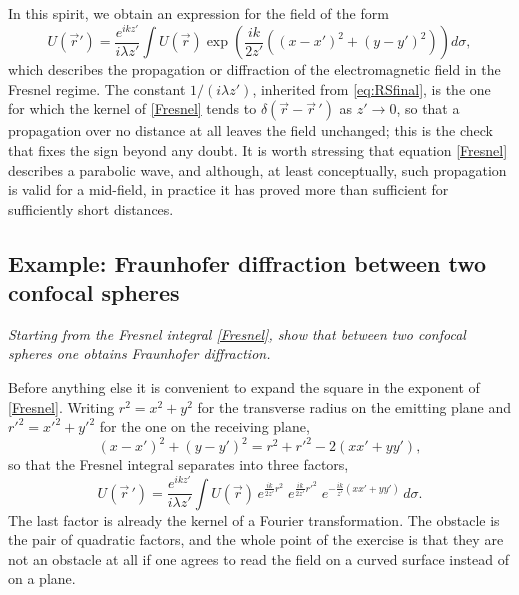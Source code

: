 In this spirit, we obtain an expression for the field of the form
\begin{equation}
	\label{Fresnel}
	U(\vec{r}') = \dfrac{e^{ikz'}}{i\lambda z'} \int U(\vec{r}) \exp \left(\dfrac{ik}{2z'} ((x-x')^2 + (y-y')^2) \right) d\sigma,
\end{equation}
which describes the propagation or diffraction of the electromagnetic field in the Fresnel regime. The constant $1/(i\lambda z')$, inherited from \eqref{eq:RSfinal}, is the one for which the kernel of \eqref{Fresnel} tends to $\delta(\vec{r}-\vec{r}\,')$ as $z'\to 0$, so that a propagation over no distance at all leaves the field unchanged; this is the check that fixes the sign beyond any doubt. It is worth stressing that equation \eqref{Fresnel} describes a parabolic wave, and although, at least conceptually, such propagation is valid for a mid-field, in practice it has proved more than sufficient for sufficiently short distances.

	\subsection{Example: Fraunhofer diffraction between two confocal spheres}

		\textit{Starting from the Fresnel integral \eqref{Fresnel}, show that between two confocal spheres one obtains Fraunhofer diffraction.}

		Before anything else it is convenient to expand the square in the exponent of \eqref{Fresnel}. Writing $r^{2} = x^{2}+y^{2}$ for the transverse radius on the emitting plane and $r'^{2} = x'^{2}+y'^{2}$ for the one on the receiving plane,
		\begin{equation}\label{eq:ExpandFresnelSquare}
			(x-x')^{2} + (y-y')^{2} = r^{2} + r'^{2} - 2\left(xx'+yy'\right),
		\end{equation}
		so that the Fresnel integral separates into three factors,
		\begin{equation}\label{eq:FresnelThreeFactors}
			U(\vec{r}\,') = \dfrac{e^{ikz'}}{i\lambda z'}\int U(\vec{r})\,
			e^{\frac{ik}{2z'}r^{2}}\;
			e^{\frac{ik}{2z'}r'^{2}}\;
			e^{-\frac{ik}{z'}\left(xx'+yy'\right)}\,d\sigma .
		\end{equation}
		The last factor is already the kernel of a Fourier transformation. The obstacle is the pair of quadratic factors, and the whole point of the exercise is that they are not an obstacle at all if one agrees to read the field on a curved surface instead of on a plane.

